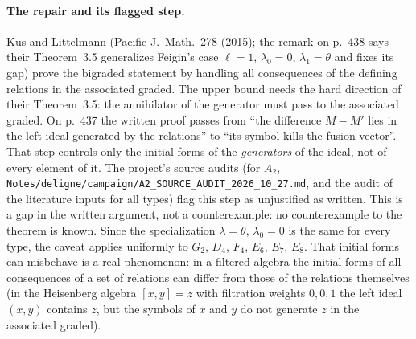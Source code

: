 \paragraph{The repair and its flagged step.} Kus and Littelmann (Pacific J.\ Math.\ 278 (2015); the remark on p.~438 says their
Theorem~3.5 generalizes Feigin's case $\ell=1$, $\lambda_0=0$, $\lambda_1=\theta$ and fixes its gap) prove the bigraded statement by
handling all consequences of the defining relations in the associated graded. The upper bound needs the hard direction of their
Theorem~3.5: the annihilator of the generator must pass to the associated graded. On p.~437 the written proof passes from ``the
difference $M-M'$ lies in the left ideal generated by the relations'' to ``its symbol kills the fusion vector''. That step controls only
the initial forms of the \emph{generators} of the ideal, not of every element of it. The project's source audits (for $A_2$,
\texttt{Notes/deligne/campaign/A2\_SOURCE\_AUDIT\_2026\_10\_27.md}, and the audit of the literature inputs for all types) flag this step as
unjustified as written. This is a gap in the written argument, not a counterexample: no counterexample to the theorem is known. Since the
specialization $\lambda=\theta$, $\lambda_0=0$ is the same for every type, the caveat applies uniformly to $G_2$, $D_4$, $F_4$, $E_6$,
$E_7$, $E_8$. That initial forms can misbehave is a real phenomenon: in a filtered algebra the initial forms of all consequences of a set of
relations can differ from those of the relations themselves (in the Heisenberg algebra $[x,y]=z$ with filtration weights $0,0,1$ the
left ideal $(x,y)$ contains $z$, but the symbols of $x$ and $y$ do not generate $z$ in the associated graded).

